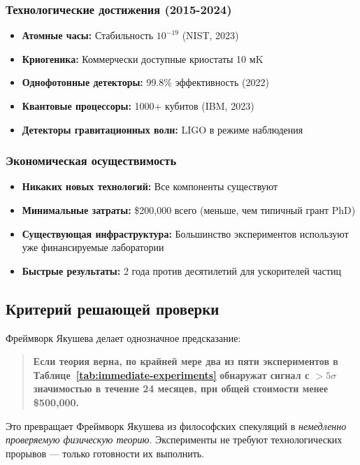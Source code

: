 \documentclass[11pt,a4paper]{article}
\begin{document}
	\subsubsection{Технологические достижения (2015-2024)}
	
	\begin{itemize}
		\item \textbf{Атомные часы:} Стабильность $10^{-19}$ (NIST, 2023)
		\item \textbf{Криогеника:} Коммерчески доступные криостаты 10 мK
		\item \textbf{Однофотонные детекторы:} 99.8\% эффективность (2022)
		\item \textbf{Квантовые процессоры:} 1000+ кубитов (IBM, 2023)
		\item \textbf{Детекторы гравитационных волн:} LIGO в режиме наблюдения
	\end{itemize}
	
	\subsubsection{Экономическая осуществимость}
	
	\begin{itemize}
		\item \textbf{Никаких новых технологий:} Все компоненты существуют
		\item \textbf{Минимальные затраты:} \$200,000 всего (меньше, чем типичный грант PhD)
		\item \textbf{Существующая инфраструктура:} Большинство экспериментов используют уже финансируемые лаборатории
		\item \textbf{Быстрые результаты:} 2 года против десятилетий для ускорителей частиц
	\end{itemize}
	
	\subsection{Критерий решающей проверки}
	
	Фреймворк Якушева делает однозначное предсказание:
	
	\begin{quote}
		\textbf{Если теория верна, по крайней мере два из пяти экспериментов в Таблице~\ref{tab:immediate-experiments}} \textbf{обнаружат сигнал с $>5\sigma$ значимостью в течение 24 месяцев, при общей стоимости менее \$500,000.}
	\end{quote}
	
	Это превращает Фреймворк Якушева из философских спекуляций в \emph{немедленно проверяемую физическую теорию}. Эксперименты не требуют технологических прорывов — только готовности их выполнить.
	
\end{document}
